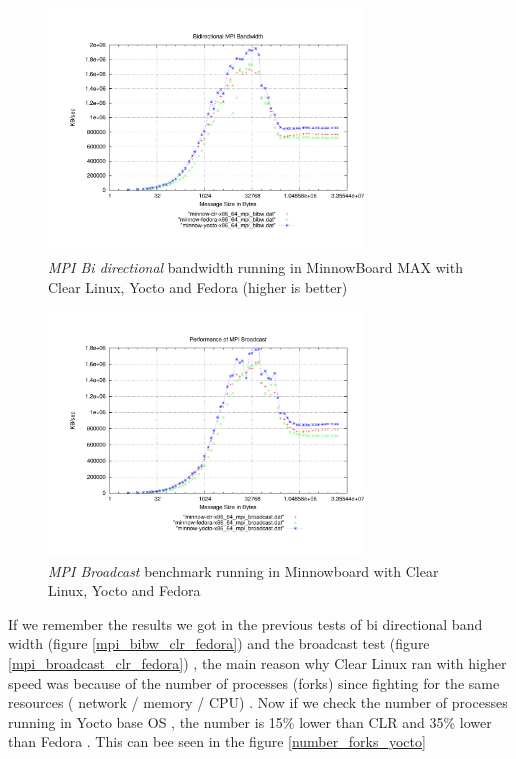 \begin{figure}[H]
\centering
\includegraphics[width=0.75\textwidth]{images/mpbench_yocto_experiments/mpi_bibw.pdf}
\caption{\textit{MPI Bi directional} bandwidth running in MinnowBoard MAX with Clear Linux,
Yocto and Fedora (higher is better)}
\label{mpi_bibw_yocto}
\end{figure}


\begin{figure}[H]
\centering
\includegraphics[width=0.75\textwidth]{images/mpbench_yocto_experiments/mpi_broadcast.pdf}
\caption{\textit{MPI Broadcast} benchmark running in Minnowboard with Clear Linux, Yocto
and Fedora }
\label{mpi_broadcast_yocto}
\end{figure}

If we remember the results we got in the previous tests of bi directional band
width (figure \ref{mpi_bibw_clr_fedora}) and the broadcast test (figure
\ref{mpi_broadcast_clr_fedora}) , the main reason why Clear Linux ran with
higher speed was because of the number of processes (forks) since fighting for
the same resources ( network / memory / CPU) . Now if we check the number of
processes running in Yocto base OS , the number is 15\% lower than CLR and 35\%
lower than Fedora . This can bee seen in the figure \ref{number_forks_yocto}

